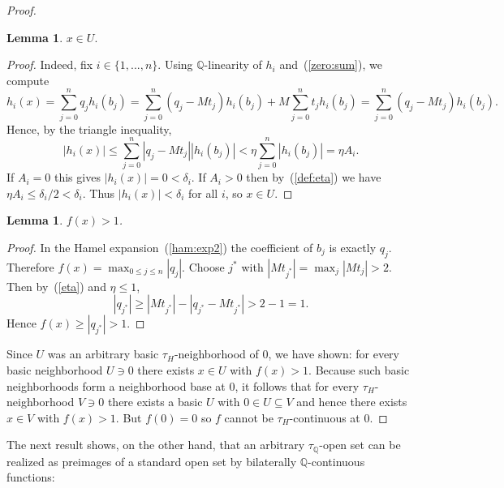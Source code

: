 \documentclass[11pt]{amsart} %
\newtheorem{lemma}[theorem]{Lemma}
\theoremstyle{definition}
\newtheorem{remark}[theorem]{Remark}
\newcommand{\Q}{\mathbb{Q}}
\begin{document}
\begin{proof}
\begin{lemma} 
$x\in U.$ 
\end{lemma} 
\begin{proof} 
Indeed, fix $i\in\{1,...,n\}$. Using $\mathbb{Q}$-linearity of $h_{i}$ and~(\ref{zero:sum}), we compute
\[ h_{i}(x)=\sum_{j=0}^{n}q_{j}h_{i}(b_{j})=\sum_{j=0}^{n}(q_{j}-Mt_{j})h_{i}(b_{j})+M\sum_{j=0}^{n}t_{j}h_{i}(b_{j})=\sum_{j=0}^{n}(q_{j}-Mt_{j})h_{i}(b_{j}). \]
Hence, by the triangle inequality,
\begin{equation} 
|h_{i}(x)|\le\sum_{j=0}^{n}|q_{j}-Mt_{j}||h_{i}(b_{j})|<\eta\sum_{j=0}^{n}|h_{i}(b_{j})|=\eta A_{i}. \end{equation} 
If $A_{i}=0$ this gives $|h_{i}(x)|=0<\delta_{i}$. If $A_{i}>0$ then by~(\ref{def:eta}) we have $\eta A_{i}\le\delta_{i}/2<\delta_{i}$. Thus $|h_{i}(x)|<\delta_{i}$ for all $i$, so $x\in U$.
\end{proof} 

\begin{lemma} 
$f(x)>1$. 
\end{lemma} 
\begin{proof} 
In the Hamel expansion~(\ref{ham:exp2}) the coefficient of $b_{j}$ is exactly $q_{j}$. Therefore $f(x)=\max_{0\le j\le n}|q_{j}|$. Choose $j^{*}$ with $|Mt_{j^{*}}|=\max_{j}|Mt_{j}|>2$. Then by~(\ref{eta}) and $\eta\le1$,
\begin{equation} 
|q_{j^{*}}|\ge|Mt_{j^{*}}|-|q_{j^{*}}-Mt_{j^{*}}|>2-1=1. 
\end{equation} 
Hence $f(x)\ge|q_{j^{*}}|>1$.
\end{proof} 
Since $U$ was an arbitrary basic $\tau_{H}$-neighborhood of $0$, we have shown: for every basic neighborhood $U\ni0$ there exists $x\in U$ with $f(x)>1$. Because such basic neighborhoods form a neighborhood base at $0$, it follows that for every $\tau_{H}$-neighborhood $V\ni0$ there exists a basic $U$ with $0\in U\subseteq V$ and hence there exists $x\in V$ with $f(x)>1$. But $f(0)=0$ so $f$ cannot be $\tau_{H}$-continuous at $0$.
\end{proof}


The next result shows, on the other hand, that an arbitrary $\tau_{\Q}$-open set can be realized as preimages of a standard open set by bilaterally $\Q$-continuous functions: 
\end{document}
